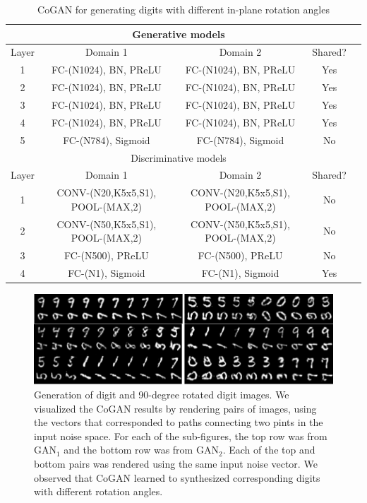 \begin{table}[thb!]
\small
\centering
{
\caption{CoGAN for generating digits with different in-plane rotation angles}
\label{tbl::mnist_rotation}
\begin{tabular}{|c|c|c|c|c|}
\hline
\multicolumn{4}{|c|}{Generative models}\\
\hline\rule{0pt}{2ex}    
Layer &  Domain 1 & Domain 2 & Shared? \\
\hline 
1 &  FC-(N1024), BN, PReLU & FC-(N1024), BN, PReLU & Yes\\
2 &  FC-(N1024), BN, PReLU & FC-(N1024), BN, PReLU &Yes\\
3 &  FC-(N1024), BN, PReLU & FC-(N1024), BN, PReLU &Yes\\
4 &  FC-(N1024), BN, PReLU & FC-(N1024), BN, PReLU &Yes\\
5 &  FC-(N784), Sigmoid & FC-(N784), Sigmoid & No\\
\hline
\hline
\multicolumn{4}{|c|}{Discriminative models}\\
\hline\rule{0pt}{2ex} 
Layer &  Domain 1 & Domain 2 & Shared? \\
\hline
1 & CONV-(N20,K5x5,S1), POOL-(MAX,2) & CONV-(N20,K5x5,S1), POOL-(MAX,2) &No\\
2 & CONV-(N50,K5x5,S1), POOL-(MAX,2) & CONV-(N50,K5x5,S1), POOL-(MAX,2) &No\\
3 & FC-(N500), PReLU & FC-(N500), PReLU &No\\
4 & FC-(N1), Sigmoid & FC-(N1), Sigmoid &Yes\\
\hline
\end{tabular}
}
\end{table}
\begin{figure}[thb!]
\centering
\includegraphics[trim=0.0in 0.0in 0.0in 0in, width=1.0\textwidth]{result_mnist_rotation.pdf}
\caption{Generation of digit and 90-degree rotated digit images. We visualized the CoGAN results by rendering pairs of images, using the vectors that corresponded to paths connecting two pints in the input noise space. For each of the sub-figures, the top row was from $\text{GAN}_1$ and the bottom row was from $\text{GAN}_2$. Each of the top and bottom pairs was rendered using the same input noise vector. We observed that CoGAN learned to synthesized corresponding digits with different rotation angles.}
\label{fig::result_mnist_rotation}
\end{figure}

